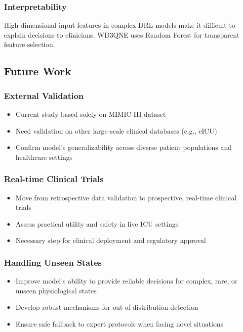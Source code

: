 \subsubsection*{Interpretability}
High-dimensional input features in complex DRL models make it difficult to explain decisions to clinicians. WD3QNE uses Random Forest for transparent feature selection.

\subsection*{Future Work}

\subsubsection*{External Validation}
\begin{itemize}
    \item Current study based solely on MIMIC-III dataset
    \item Need validation on other large-scale clinical databases (e.g., eICU)
    \item Confirm model's generalizability across diverse patient populations and healthcare settings
\end{itemize}

\subsubsection*{Real-time Clinical Trials}
\begin{itemize}
    \item Move from retrospective data validation to prospective, real-time clinical trials
    \item Assess practical utility and safety in live ICU settings
    \item Necessary step for clinical deployment and regulatory approval
\end{itemize}

\subsubsection*{Handling Unseen States}
\begin{itemize}
    \item Improve model's ability to provide reliable decisions for complex, rare, or unseen physiological states
    \item Develop robust mechanisms for out-of-distribution detection
    \item Ensure safe fallback to expert protocols when facing novel situations
\end{itemize}

